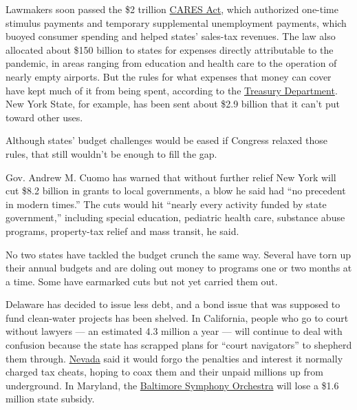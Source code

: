 Lawmakers soon passed the \$2 trillion
\href{https://www.nytimes3xbfgragh.onion/article/coronavirus-stimulus-package-questions-answers.html}{CARES
Act}, which authorized one-time stimulus payments and temporary
supplemental unemployment payments, which buoyed consumer spending and
helped states' sales-tax revenues. The law also allocated about \$150
billion to states for expenses directly attributable to the pandemic, in
areas ranging from education and health care to the operation of nearly
empty airports. But the rules for what expenses that money can cover
have kept much of it from being spent, according to the
\href{https://home.treasury.gov/system/files/136/Interim-Report-of-Costs-by-Category-Incurred-by-State-and-Local-Recipients-through-June-30.pdf}{Treasury
Department}. New York State, for example, has been sent about \$2.9
billion that it can't put toward other uses.

Although states' budget challenges would be eased if Congress relaxed
those rules, that still wouldn't be enough to fill the gap.

Gov. Andrew M. Cuomo has warned that without further relief New York
will cut \$8.2 billion in grants to local governments, a blow he said
had ``no precedent in modern times.'' The cuts would hit ``nearly every
activity funded by state government,'' including special education,
pediatric health care, substance abuse programs, property-tax relief and
mass transit, he said.

No two states have tackled the budget crunch the same way. Several have
torn up their annual budgets and are doling out money to programs one or
two months at a time. Some have earmarked cuts but not yet carried them
out.

Delaware has decided to issue less debt, and a bond issue that was
supposed to fund clean-water projects has been shelved. In California,
people who go to court without lawyers --- an estimated 4.3 million a
year --- will continue to deal with confusion because the state has
scrapped plans for ``court navigators'' to shepherd them through.
\href{https://www.reviewjournal.com/news/politics-and-government/nevada/nevada-legislature-makes-small-progress-on-budget-gap-2074754/}{Nevada}
said it would forgo the penalties and interest it normally charged tax
cheats, hoping to coax them and their unpaid millions up from
underground. In Maryland, the
\href{https://www.nytimes3xbfgragh.onion/2019/06/17/arts/music/baltimore-symphony-musicians-lock-out.html}{Baltimore
Symphony Orchestra} will lose a \$1.6 million state subsidy.


